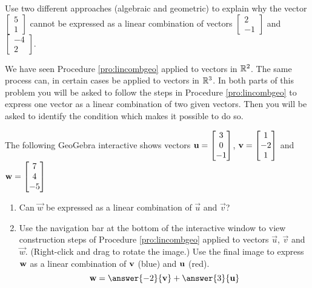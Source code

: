 \documentclass{ximera}
\begin{document}
\begin{problem}\label{prob:lincombtwovectors3}
Use two different approaches (algebraic and geometric) to explain why the vector $\begin{bmatrix}5\\1\end{bmatrix}$ cannot be expressed as a linear combination of vectors $\begin{bmatrix}2\\-1\end{bmatrix}$ and $\begin{bmatrix}-4\\2\end{bmatrix}$.
\end{problem}

\begin{problem}%
We have seen Procedure \ref{pro:lincombgeo} applied to vectors in $\mathbb{R}^2$.  The same process can, in certain cases be applied to vectors in $\mathbb{R}^3$.  In both parts of this problem you will be asked to follow the steps in Procedure \ref{pro:lincombgeo} to express one vector as a linear combination of two given vectors.  Then you will be asked to identify the condition which makes it possible to do so.

\begin{problem}\label{prob:lincombtwovectors4a}
The following GeoGebra interactive shows vectors ${\bf u}=\begin{bmatrix}3\\0\\-1\end{bmatrix}$, ${\bf v}=\begin{bmatrix}1\\-2\\1\end{bmatrix}$ and ${\bf w}=\begin{bmatrix}7\\4\\-5\end{bmatrix}$
\begin{center} 
\end{center}
\begin{enumerate}
 \item
 Can $\vec{w}$ be expressed as a linear combination of $\vec{u}$ and $\vec{v}$?
 \begin{multipleChoice}
 \end{multipleChoice}
 \item 
 Use the navigation bar at the bottom of the interactive window to view construction steps of Procedure \ref{pro:lincombgeo} applied to vectors $\vec{u}$, $\vec{v}$ and $\vec{w}$.  (Right-click and drag to rotate the image.)  Use the final image to 
 express ${\bf w}$ as a linear combination of ${\bf v}$ (blue) and ${\bf u}$ (red).
 $${\bf w}=\answer{-2}{\bf v}+\answer{3}{\bf u}$$
 \end{enumerate}
\end{problem}


\end{problem}
\end{document}
